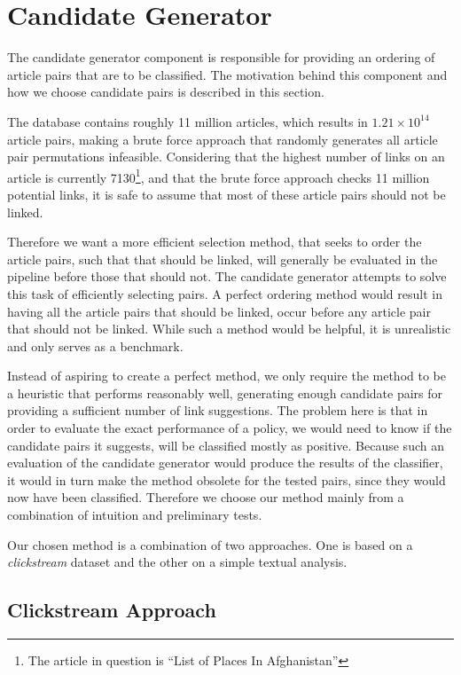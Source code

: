 \section{Candidate Generator}
The candidate generator component is responsible for providing an ordering of article pairs that are to be classified. The motivation behind this component and how we choose candidate pairs is described in this section.

The database contains roughly 11 million articles, which results in $1.21 \times 10^{14}$ article pairs, making a brute force approach that randomly generates all article pair permutations infeasible. Considering that the highest number of links on an article is currently 7130\footnote{The article in question is \enquote{List of Places In Afghanistan}}, and that the brute force approach checks 11 million potential links, it is safe to assume that most of these article pairs should not be linked.

Therefore we want a more efficient selection method, that seeks to order the article pairs, such that that should be linked, will generally be evaluated in the pipeline before those that should not. The candidate generator attempts to solve this task of efficiently selecting pairs. A perfect ordering method would result in having all the article pairs that should be linked, occur before any article pair that should not be linked. While such a method would be helpful, it is unrealistic and only serves as a benchmark.

Instead of aspiring to create a perfect method, we only require the method to be a heuristic that performs reasonably well, generating enough candidate pairs for providing a sufficient number of link suggestions. The problem here is that in order to evaluate the exact performance of a policy, we would need to know if the candidate pairs it suggests, will be classified mostly as positive. Because such an evaluation of the candidate generator would produce the results of the classifier, it would in turn make the method obsolete for the tested pairs, since they would now have been classified.  Therefore we choose our method mainly from a combination of intuition and preliminary tests.

Our chosen method is a combination of two approaches. One is based on a \emph{clickstream} dataset and the other on a simple textual analysis.

\subsection{Clickstream Approach}\label{sec:candidate_clickstream}

